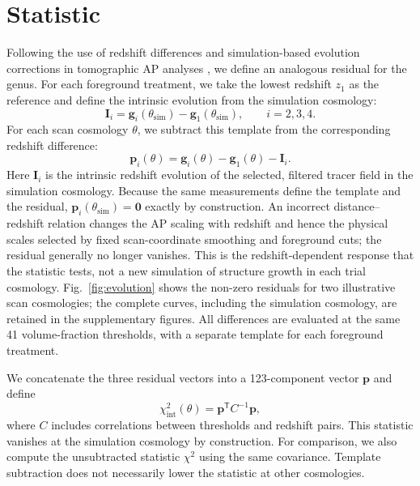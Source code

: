 \section{Statistic}\label{sec:statistics}
Following the use of redshift differences and simulation-based evolution corrections in tomographic AP analyses \citep{Li2015Tomographic2PCF,Li2016TomographicAP}, we define an analogous residual for the genus. For each foreground treatment, we take the lowest redshift $z_1$ as the reference and define the intrinsic evolution from the simulation cosmology:
\begin{equation}
\boldsymbol I_i=\boldsymbol g_i(\theta_{\mathrm{sim}})-\boldsymbol g_1(\theta_{\mathrm{sim}}),\qquad i=2,3,4.
\end{equation}
For each scan cosmology $\theta$, we subtract this template from the corresponding redshift difference:
\begin{equation}
\boldsymbol p_i(\theta)=\boldsymbol g_i(\theta)-\boldsymbol g_1(\theta)-\boldsymbol I_i.
\end{equation}
Here $\boldsymbol I_i$ is the intrinsic redshift evolution of the selected, filtered tracer field in the simulation cosmology. Because the same measurements define the template and the residual, $\boldsymbol p_i(\theta_{\mathrm{sim}})=\boldsymbol0$ exactly by construction. An incorrect distance--redshift relation changes the AP scaling with redshift and hence the physical scales selected by fixed scan-coordinate smoothing and foreground cuts; the residual generally no longer vanishes. This is the redshift-dependent response that the statistic tests, not a new simulation of structure growth in each trial cosmology. Fig.~\ref{fig:evolution} shows the non-zero residuals for two illustrative scan cosmologies; the complete curves, including the simulation cosmology, are retained in the supplementary figures. All differences are evaluated at the same 41 volume-fraction thresholds, with a separate template for each foreground treatment.

We concatenate the three residual vectors into a 123-component vector $\boldsymbol p$ and define
\begin{equation}
\chi^2_{\mathrm{int}}(\theta)=\boldsymbol p^{\mathsf T}C^{-1}\boldsymbol p,
\end{equation}
where $C$ includes correlations between thresholds and redshift pairs. This statistic vanishes at the simulation cosmology by construction. For comparison, we also compute the unsubtracted statistic $\chi^2$ using the same covariance. Template subtraction does not necessarily lower the statistic at other cosmologies.

